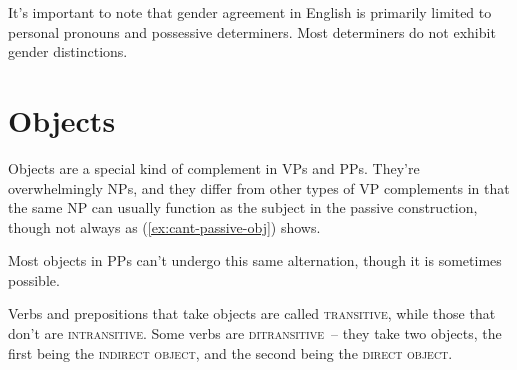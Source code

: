 It's important to note that gender agreement in English is primarily limited to personal pronouns and possessive determiners. Most determiners do not exhibit gender distinctions.

\section{Objects}

Objects are a special kind of complement in VPs and PPs. They're overwhelmingly NPs, and they differ from other types of VP complements in that the same NP can usually function as the subject in the passive construction, though not always as (\ref{ex:cant-passive-obj}) shows.

\ea
    \z
\z
\ea \label{ex:cant-passive-obj}
    \z
\z
\ea
    \z
\z

Most objects in PPs can't undergo this same alternation, though it is sometimes possible.

\ea
    \z
\z
\ea
    \z
\z{}

Verbs and prepositions that take objects are called \textsc{transitive}, while those that don't are \textsc{intransitive}. Some verbs are \textsc{ditransitive}~-- they take two objects, the first being the \textsc{indirect object}, and the second being the \textsc{direct object}.

